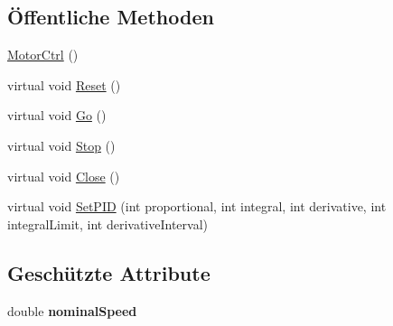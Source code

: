 \subsection*{Öffentliche Methoden}
\begin{DoxyCompactItemize}
\item 
\hyperlink{class_robot_ctrl_1_1_motor_ctrl_aa8a23abe3b652807ebf31107274fbe00}{MotorCtrl} ()
\item 
virtual void \hyperlink{class_robot_ctrl_1_1_motor_ctrl_a57b1bb7cb3895bc5d867848926b57f1e}{Reset} ()
\item 
virtual void \hyperlink{class_robot_ctrl_1_1_motor_ctrl_a1c2505454168fc2d4287fe7052425d4e}{Go} ()
\item 
virtual void \hyperlink{class_robot_ctrl_1_1_motor_ctrl_a4e61bcac558a43dd2d1470ded5fed820}{Stop} ()
\item 
virtual void \hyperlink{class_robot_ctrl_1_1_motor_ctrl_aa4d43c3586f611f8ca12924b0a92189b}{Close} ()
\item 
virtual void \hyperlink{class_robot_ctrl_1_1_motor_ctrl_ac6e7ec6b155d337dddf2fe1bc660c11b}{SetPID} (int proportional, int integral, int derivative, int integralLimit, int derivativeInterval)
\end{DoxyCompactItemize}
\subsection*{Geschützte Attribute}
\begin{DoxyCompactItemize}
\item 
\hypertarget{class_robot_ctrl_1_1_motor_ctrl_a62360699e5fbae4b92c21e4b8cc9c823}{
double {\bfseries nominalSpeed}}
\label{class_robot_ctrl_1_1_motor_ctrl_a62360699e5fbae4b92c21e4b8cc9c823}

\end{DoxyCompactItemize}
